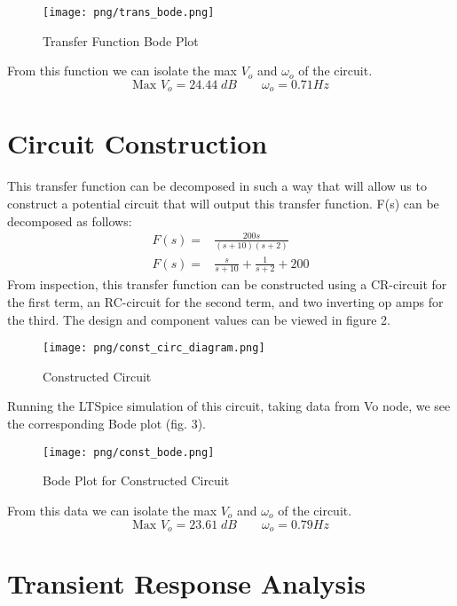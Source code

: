\documentclass{article}
\begin{document}
\begin{figure}[H]
    \centering
    \texttt{[image: png/trans\_bode.png]}
    \caption{Transfer Function Bode Plot}
    \label{fig:Transfer Function Bode Plot}
\end{figure}
From this function we can isolate the max $V_o$ and $\omega_o$ of the circuit.
$$\text{Max }V_o = 24.44\;dB\qquad \omega_o = 0.71 Hz$$


\section*{\textcolor{mycolor}{Circuit Construction}}
This transfer function can be decomposed in such a way that will allow us to construct a potential circuit that will output this transfer function. F(s) can be decomposed as follows:
\begin{align*}
    F(s) =& \frac{200s}{(s+10)(s+2)}\\
    F(s) =& \frac{s}{s+10}+\frac{1}{s+2}+200
\end{align*}
From inspection, this transfer function can be constructed using a CR-circuit for the first term, an RC-circuit for the second term, and two inverting
op amps for the third. The design and component values can be viewed in figure 2.
\begin{figure}[H]
    \centering
    \texttt{[image: png/const\_circ\_diagram.png]}
    \caption{Constructed Circuit}
    \label{fig:Constructed Circuit}
\end{figure}
Running the LTSpice simulation of this circuit, taking data from Vo node, we see the corresponding Bode plot (fig. 3).
\begin{figure}[H]
    \centering
    \texttt{[image: png/const\_bode.png]}
    \caption{Bode Plot for Constructed Circuit}
    \label{fig:Bode Constructed Circuit}
\end{figure}
From this data we can isolate the max $V_o$ and $\omega_o$ of the circuit.
$$\text{Max }V_o = 23.61\;dB\qquad \omega_o = 0.79 Hz$$

\section*{\textcolor{mycolor}{Transient Response Analysis}}
\end{document}
